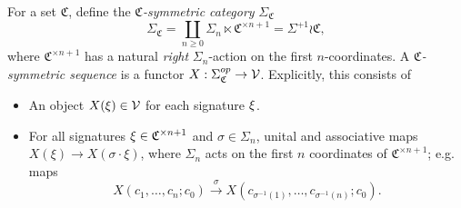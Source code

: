 \documentclass[a4paper,10pt
,draft
]{article}%
\renewcommand{\1}{\eta}%
\begin{document}
\begin{definition}
      For a set $\mathfrak C$, define the \textit{$\mathfrak C$-symmetric category} $\Sigma_{\mathfrak C}$
      \begin{equation}
            \Sigma_{\mathfrak C} = \coprod_{n \geq 0} \Sigma_n \ltimes \mathfrak C^{\times n+1} = \Sigma^{+1} \wr \mathfrak C,
      \end{equation}
      where $\mathfrak C^{\times n+1}$ has a natural \textit{right} $\Sigma_n$-action on the first $n$-coordinates.
      A \textit{$\mathfrak C$-symmetric sequence} is a functor $X: \Sigma_{\mathfrak C}^{op} \to \mathcal V$.
      Explicitly, this consists of
      \begin{itemize} %
      \item An object $X(\xi) \in \mathcal V$ for each signature $\xi$.
      \item For all signatures $\xi \in \mathfrak C^{\times n+1}$ and $\sigma \in \Sigma_n$,
            unital and associative maps $X(\xi) \to X(\sigma \cdot \xi)$,
            where $\Sigma_n$ acts on the first $n$ coordinates of $\mathfrak C^{\times n+1}$;
            e.g. maps
            \begin{equation}
                  X(c_1, \ldots, c_n; c_0) \xrightarrow{\sigma} X(c_{\sigma^{-1}(1)}, \ldots, c_{\sigma^{-1}(n)}; c_0).
            \end{equation}
      \end{itemize}
\end{definition}
\end{document}
